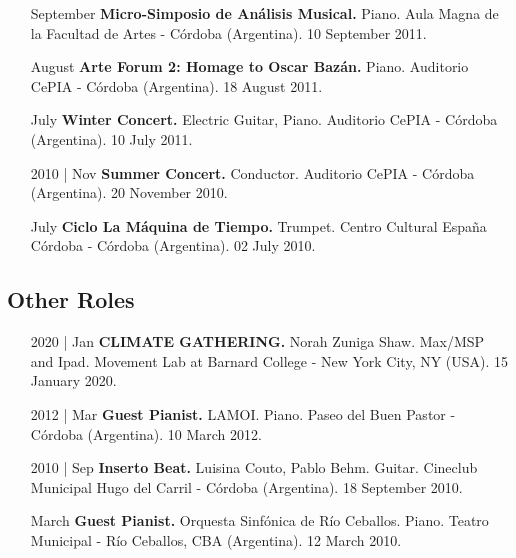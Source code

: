 \documentclass[12pt]{article}%
\begin{document}
\begin{itemize}[align=parleft,leftmargin=2.25cm,labelwidth=2cm]
\item[September]
\textbf{Micro{-}Simposio de Análisis Musical.}
Piano. 
Aula Magna de la Facultad de Artes {-} Córdoba (Argentina). 
10 September 2011.
\end{itemize}%
\begin{itemize}[align=parleft,leftmargin=2.25cm,labelwidth=2cm]
\item[August]
\textbf{Arte Forum 2: Homage to Oscar Bazán.}
Piano. 
Auditorio CePIA {-} Córdoba (Argentina). 
18 August 2011.
\end{itemize}%
\begin{itemize}[align=parleft,leftmargin=2.25cm,labelwidth=2cm]
\item[July]
\textbf{Winter Concert.}
Electric Guitar, Piano. 
Auditorio CePIA {-} Córdoba (Argentina). 
10 July 2011.
\end{itemize}%
\begin{itemize}[align=parleft,leftmargin=2.25cm,labelwidth=2cm]
\item[2010 | Nov]
\textbf{Summer Concert.}
Conductor. 
Auditorio CePIA {-} Córdoba (Argentina). 
20 November 2010.
\end{itemize}%
\begin{itemize}[align=parleft,leftmargin=2.25cm,labelwidth=2cm]
\item[July]
\textbf{Ciclo La Máquina de Tiempo.}
Trumpet. 
Centro Cultural España Córdoba {-} Córdoba (Argentina). 
02 July 2010.
\end{itemize}%
\subsection{Other Roles}%
\begin{itemize}[align=parleft,leftmargin=2.25cm,labelwidth=2cm]
\item[2020 | Jan]
\textbf{CLIMATE GATHERING.}
Norah Zuniga Shaw. 
Max/MSP and Ipad. 
Movement Lab at Barnard College {-} New York City, NY (USA). 
15 January 2020.
\end{itemize}%
\begin{itemize}[align=parleft,leftmargin=2.25cm,labelwidth=2cm]
\item[2012 | Mar]
\textbf{Guest Pianist.}
LAMOI. 
Piano. 
Paseo del Buen Pastor {-} Córdoba (Argentina). 
10 March 2012.
\end{itemize}%
\begin{itemize}[align=parleft,leftmargin=2.25cm,labelwidth=2cm]
\item[2010 | Sep]
\textbf{Inserto Beat.}
Luisina Couto, Pablo Behm. 
Guitar. 
Cineclub Municipal Hugo del Carril {-} Córdoba (Argentina). 
18 September 2010.
\end{itemize}%
\begin{itemize}[align=parleft,leftmargin=2.25cm,labelwidth=2cm]
\item[March]
\textbf{Guest Pianist.}
Orquesta Sinfónica de Río Ceballos. 
Piano. 
Teatro Municipal {-} Río Ceballos, CBA (Argentina). 
12 March 2010.
\end{itemize}
\end{document}
